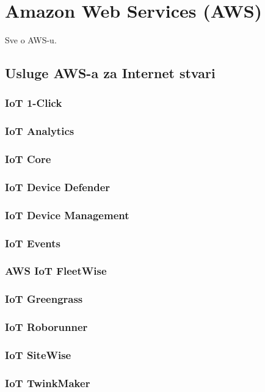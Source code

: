 \chapter{Amazon Web Services (AWS)}

Sve o AWS-u.
 
\section{Usluge AWS-a za Internet stvari}

\subsection{IoT 1-Click}
\subsection{IoT Analytics}
\subsection{IoT Core}
\subsection{IoT Device Defender}
\subsection{IoT Device Management}
\subsection{IoT Events}
\subsection{AWS IoT FleetWise}
\subsection{IoT Greengrass}
\subsection{IoT Roborunner}
\subsection{IoT SiteWise}
\subsection{IoT TwinkMaker}

\eject